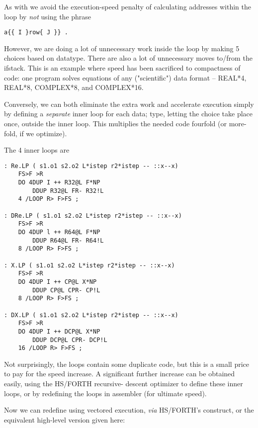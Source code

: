 As with  we avoid the execution-speed penalty of calculating addresses within the loop by \textit{not} using the phrase

\begin{verbatim}
a{{ I }row{ J }} .
\end{verbatim}

However, we are doing a lot of unnecessary work inside the loop by making 5 choices based on datatype. There are also a lot of unnecessary moves to/from the ifstack. This is an example where speed has been sacrificed to compactness of code: one program solves equations of any ("scientific") data format -- REAL*4, REAL*8, COMPLEX*8, and COMPLEX*16. 

Conversely, we can both eliminate the extra work and accelerate execution simply by defining a \textit{separate} inner loop for each data; type, letting the choice take place once, outside the inner loop. This multiplies the needed code fourfold (or more-fold, if we optimize).

The 4 inner loops are
\begin{verbatim}
: Re.LP ( s1.o1 s2.o2 L*istep r2*istep -- ::x--x)
    FS>F >R
    DO 4DUP I ++ R32@L F*NP
        DDUP R32@L FR- R32!L
    4 /LOOP R> F>FS ;

: DRe.LP ( s1.o1 s2.o2 L*istep r2*istep -- ::x--x)
    FS>F >R
    DO 4DUP l ++ R64@L F*NP
        DDUP R64@L FR- R64!L
    8 /LOOP R> F>FS ;

: X.LP ( s1.o1 s2.o2 L*istep r2*istep -- ::x--x)
    FS>F >R
    DO 4DUP I ++ CP@L X*NP
        DDUP CP@L CPR- CP!L
    8 /LOOP R> F>FS ;

: DX.LP ( s1.o1 s2.o2 L*istep r2*istep -- ::x--x)
    FS>F >R
    DO 4DUP I ++ DCP@L X*NP
        DDUP DCP@L CPR- DCP!L
    16 /LOOP R> F>FS ;
\end{verbatim} 
Not surprisingly, the loops contain some duplicate code, but this
is a small price to pay for the speed increase. A significant further
increase can be obtained easily, using the HS/FORTH recursive-
descent optimizer to define these inner loops, or by redefining
the loops in assembler (for ultimate speed).

Now we can redefine  using vectored execution, \textit{via}
HS/FORTH's  construct, or the equivalent high-level version given here:

